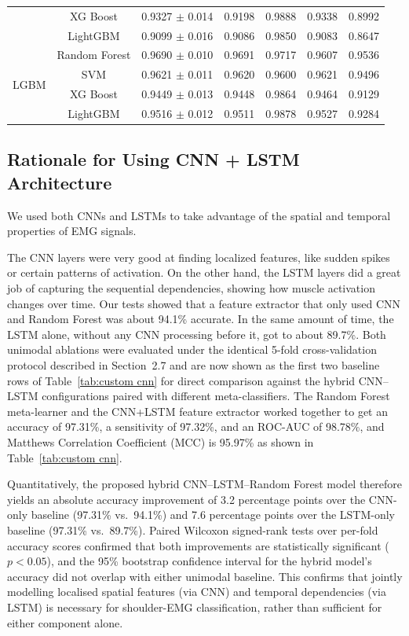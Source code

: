 \documentclass{elektr}
\newcommand{\yh}[1]{#1}
\begin{document}
\begin{table}[htbp]
\begin{tabular}{|c|c|c|c|c|c|c|}
		& XG Boost               & 0.9327 $\pm$ 0.014 & 0.9198 & 0.9888 & 0.9338 & 0.8992 \\
		& LightGBM               & 0.9099 $\pm$ 0.016 & 0.9086 & 0.9850 & 0.9083 & 0.8647 \\
		\hline
		\multirow{4}{*}{LGBM}
		& Random Forest          & 0.9690 $\pm$ 0.010 & 0.9691 & 0.9717 & 0.9607 & 0.9536 \\
		& SVM                    & 0.9621 $\pm$ 0.011 & 0.9620 & 0.9600 & 0.9621 & 0.9496 \\
		& XG Boost               & 0.9449 $\pm$ 0.013 & 0.9448 & 0.9864 & 0.9464 & 0.9129 \\
		& LightGBM               & 0.9516 $\pm$ 0.012 & 0.9511 & 0.9878 & 0.9527 & 0.9284 \\
		\hline
	\end{tabular}
\end{table}


\subsection{Rationale for Using CNN + LSTM Architecture}

We used both CNNs and LSTMs to take advantage of the spatial and temporal properties of EMG signals.

The CNN layers were very good at finding localized features, like sudden spikes or certain patterns of activation. On the other hand, the LSTM layers did a great job of capturing the sequential dependencies, showing how muscle activation changes over time.
Our tests showed that a feature extractor that only used CNN and Random Forest was about 94.1\% accurate. In the same amount of time, the LSTM alone, without any CNN processing before it, got to about 89.7\%. \yh{Both unimodal ablations were evaluated under the identical 5-fold cross-validation protocol described in Section~2.7 and are now shown as the first two baseline rows of Table~\ref{tab:custom cnn} for direct comparison against the hybrid CNN--LSTM configurations paired with different meta-classifiers.} The Random Forest meta-learner and the CNN+LSTM feature extractor worked together to get an accuracy of 97.31\%, a sensitivity of 97.32\%, and an ROC-AUC of 98.78\%, and Matthews Correlation Coefficient (MCC) is 95.97\% as shown in Table~\ref{tab:custom cnn}.

\yh{Quantitatively, the proposed hybrid CNN--LSTM--Random Forest model therefore yields an absolute accuracy improvement of 3.2 percentage points over the CNN-only baseline (97.31\% vs.\ 94.1\%) and 7.6 percentage points over the LSTM-only baseline (97.31\% vs.\ 89.7\%). Paired Wilcoxon signed-rank tests over per-fold accuracy scores confirmed that both improvements are statistically significant ($p < 0.05$), and the 95\% bootstrap confidence interval for the hybrid model's accuracy did not overlap with either unimodal baseline. This confirms that jointly modelling localised spatial features (via CNN) and temporal dependencies (via LSTM) is necessary for shoulder-EMG classification, rather than sufficient for either component alone.}
\end{document}
